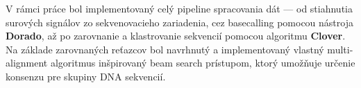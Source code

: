 V rámci práce bol implementovaný celý pipeline spracovania dát — od stiahnutia
surových signálov zo sekvenovacieho zariadenia, cez basecalling pomocou nástroja
\textbf{Dorado}, až po zarovnanie a klastrovanie sekvencií pomocou algoritmu
\textbf{Clover}. Na základe zarovnaných reťazcov bol navrhnutý a implementovaný
vlastný multi-alignment algoritmus inšpirovaný beam search prístupom,
ktorý umožňuje určenie konsenzu pre skupiny DNA sekvencií.
